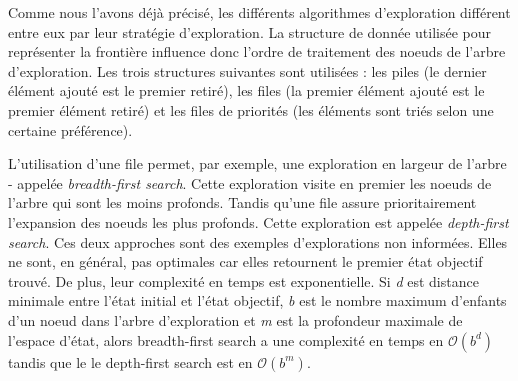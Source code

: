 Comme nous l'avons déjà précisé, les différents algorithmes d'exploration différent entre eux par leur stratégie d'exploration. La structure de donnée utilisée pour représenter la frontière influence donc l'ordre de traitement des noeuds de l'arbre d'exploration. Les trois structures suivantes sont utilisées : les piles (le dernier élément ajouté est le premier retiré), les files (la premier élément ajouté est le premier élément retiré) et les files de priorités (les éléments sont triés selon une certaine préférence).

\begin{comment}

Les stratégies d'exploration sont évaluées selon quatre critères:
\begin{itemize}
	\item[\textbf{Complétude}] La stratégie trouve-t-elle toujours une solution si elle existe?
	\item[\textbf{Complexité en temps}] Quel est le nombre de noeuds de l'arbre d'exploration qui sont générés lors de celle-ci?
	\item[\textbf{Complexité en espace}] Quel est le nombre de noeuds maximal gardé en mémoire?
	\item[\textbf{Optimalité}] La solution retournée est-elle une solution optimale?
\end{itemize}
	
Pour exprimer la complexité en temps et en mémoire, les notations suivantes sont utilisées:

\begin{itemize}
	\item[$\bullet$] \emph{d}: distance minimale entre l'état initial et l'état objectif.
	\item[$\bullet$] \emph{b}: nombre maximum d'enfants d'un noeud dans l'arbre d'exploration.
	\item[$\bullet$] \emph{m}: profondeur maximale de l'espace d'état.	
\end{itemize}
\end{comment}

L'utilisation d'une file permet, par exemple, une exploration en largeur de l'arbre - appelée \emph{breadth-first search}. Cette exploration visite en premier les noeuds de l'arbre qui sont les moins profonds. Tandis qu'une file assure prioritairement l'expansion des noeuds les plus profonds. Cette exploration est appelée \emph{depth-first search}. Ces deux approches sont des exemples d'explorations non informées. Elles ne sont, en général, pas optimales car elles retournent le premier état objectif trouvé. De plus, leur complexité en temps est exponentielle. Si \emph{d} est distance minimale entre l'état initial et l'état objectif, \emph{b} est le nombre maximum d'enfants d'un noeud dans l'arbre d'exploration et \emph{m} est la profondeur maximale de l'espace d'état, alors breadth-first search a une complexité en temps en $\mathcal{O}(b^d)$ tandis que le le depth-first search est en $\mathcal{O}(b^m)$.\\


